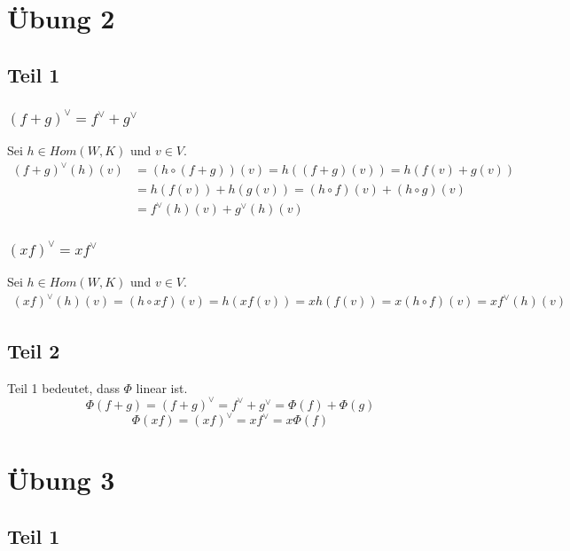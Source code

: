 \documentclass[a4paper,10pt]{article}
\begin{document}
\section*{Übung 2}

\subsection*{Teil 1}

\subsubsection*{$(f + g)^\vee = f^\vee + g^\vee$}

Sei $h \in Hom(W, K)$ und $v \in V$.
\begin{align}
 (f + g)^\vee(h)(v) & = (h \circ (f + g))(v) = h((f + g)(v)) = h(f(v) + g(v))\\
 & = h(f(v)) + h(g(v)) = (h \circ f)(v) + (h \circ g)(v)\\
 & = f^\vee(h)(v) + g^\vee(h)(v)
\end{align}

\subsubsection*{$(xf)^\vee = xf^\vee$}

Sei $h \in Hom(W, K)$ und $v \in V$.
\begin{align}
 (xf)^\vee(h)(v) = (h \circ xf)(v) = h(xf(v)) = xh(f(v)) = x(h \circ f)(v) = xf^\vee(h)(v)
\end{align}

\subsection*{Teil 2}

Teil 1 bedeutet, dass $\Phi$ linear ist.
\begin{equation}
 \Phi(f + g) = (f + g)^\vee = f^\vee + g^\vee = \Phi(f) + \Phi(g)
\end{equation}
\begin{equation}
 \Phi(xf) = (xf)^\vee = xf^\vee = x\Phi(f)
\end{equation}

\section*{Übung 3}

\subsection*{Teil 1}
\end{document}
